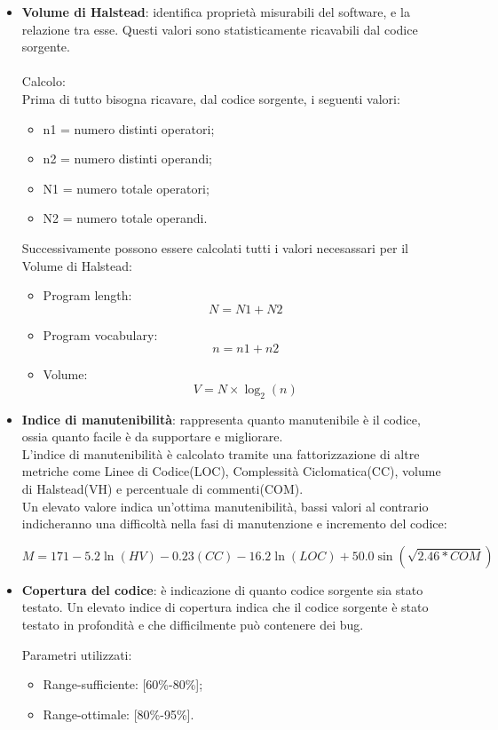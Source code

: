 {{{\begin{itemize}
		\item \textbf{Volume di Halstead}: identifica proprietà misurabili del software, e la relazione tra esse. Questi valori sono statisticamente ricavabili dal codice sorgente.\\\\
		Calcolo:\\
		Prima di tutto bisogna ricavare, dal codice sorgente, i seguenti valori:
		\begin{itemize}		
		\item n1 = numero distinti operatori;
		\item n2 = numero distinti operandi;
		\item N1 = numero totale operatori;
		\item N2 = numero totale operandi.
		
	    \end{itemize}
	    Successivamente possono essere calcolati tutti i valori necesassari per il Volume di Halstead:
	    \begin{itemize}
		\item Program length: \[N = N1 + N2\]
		\item Program vocabulary: \[n = n1 + n2\]
	    \item Volume: \[V= N \times \log_2(n)\]
		\end{itemize}
		\item \textbf{Indice di manutenibilità}: rappresenta quanto manutenibile è il codice, ossia quanto facile è da supportare e migliorare.\\
		L'indice di manutenibilità è calcolato tramite una fattorizzazione di altre metriche come Linee di Codice(LOC), Complessità Ciclomatica(CC), volume di Halstead(VH) e percentuale di commenti(COM).\\
		Un elevato valore indica un'ottima manutenibilità, bassi valori al contrario indicheranno una difficoltà nella fasi di manutenzione e incremento del codice:
		
		\[M= 171 -5.2\ln(HV) -0.23(CC) -16.2\ln(LOC) +50.0\sin(\sqrt{2.46*COM})\]

		
		\item \textbf{Copertura del codice}: è indicazione di quanto codice sorgente sia stato testato. Un elevato indice di copertura indica che il codice sorgente è stato testato in profondità e che difficilmente può contenere dei bug.
		
		Parametri utilizzati:
		\begin{itemize}
		\item Range-sufficiente: [60\%-80\%];
		\item Range-ottimale: [80\%-95\%].
		\end{itemize}
	\end{itemize}
	}
}}
